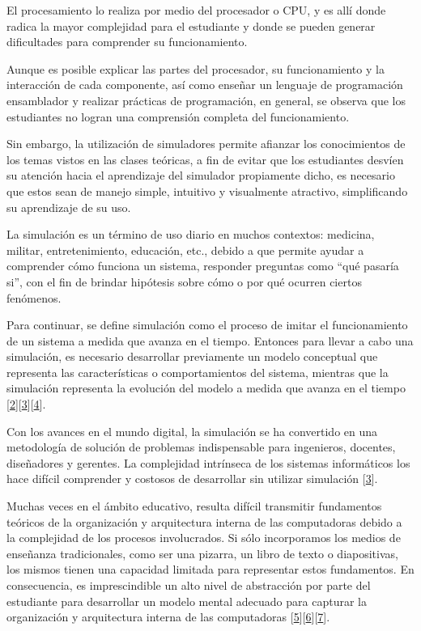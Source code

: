 \documentclass[12pt,twoside]{templates/unerthesis}
\begin{document}
El procesamiento lo realiza por medio del procesador o CPU, y es allí donde radica la mayor complejidad para el estudiante y donde se pueden generar dificultades para comprender su funcionamiento.

Aunque es posible explicar las partes del procesador, su funcionamiento y la interacción de cada componente, así como enseñar un lenguaje de programación ensamblador y realizar prácticas de programación, en general, se observa que los estudiantes no logran una comprensión completa del funcionamiento.

Sin embargo, la utilización de simuladores permite afianzar los conocimientos de los temas vistos en las clases teóricas, a fin de evitar que los estudiantes desvíen su atención hacia el aprendizaje del simulador propiamente dicho, es necesario que estos sean de manejo simple, intuitivo y visualmente atractivo, simplificando su aprendizaje de su uso.

La simulación es un término de uso diario en muchos contextos: medicina, militar, entretenimiento, educación, etc., debido a que permite ayudar a comprender cómo funciona un sistema, responder preguntas como ``qué pasaría si'', con el fin de brindar hipótesis sobre cómo o por qué ocurren ciertos fenómenos.

Para continuar, se define simulación como el proceso de imitar el funcionamiento de un sistema a medida que avanza en el tiempo. Entonces para llevar a cabo una simulación, es necesario desarrollar previamente un modelo conceptual que representa las características o comportamientos del sistema, mientras que la simulación representa la evolución del modelo a medida que avanza en el tiempo {[}\protect\hyperlink{ref-banks_discrete-event_2010}{2}{]}{[}\protect\hyperlink{ref-law_simulation_2015}{3}{]}{[}\protect\hyperlink{ref-robinson_simulation_2014}{4}{]}.

Con los avances en el mundo digital, la simulación se ha convertido en una metodología de solución de problemas indispensable para ingenieros, docentes, diseñadores y gerentes. La complejidad intrínseca de los sistemas informáticos los hace difícil comprender y costosos de desarrollar sin utilizar simulación {[}\protect\hyperlink{ref-law_simulation_2015}{3}{]}.

Muchas veces en el ámbito educativo, resulta difícil transmitir fundamentos teóricos de la organización y arquitectura interna de las computadoras debido a la complejidad de los procesos involucrados. Si sólo incorporamos los medios de enseñanza tradicionales, como ser una pizarra, un libro de texto o diapositivas, los mismos tienen una capacidad limitada para representar estos fundamentos. En consecuencia, es imprescindible un alto nivel de abstracción por parte del estudiante para desarrollar un modelo mental adecuado para capturar la organización y arquitectura interna de las computadoras {[}\protect\hyperlink{ref-lion_simuladores_2005}{5}{]}{[}\protect\hyperlink{ref-contreras_uso_2010}{6}{]}{[}\protect\hyperlink{ref-garcia-garcia_pbbcache_2020}{7}{]}.
\end{document}
